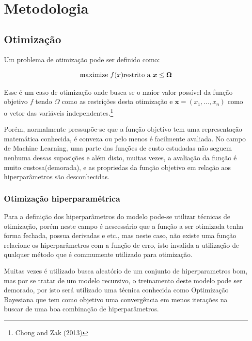 \documentclass[
	12pt,				%
	a4paper,		%
	oneside,    %
	chapter=TITLE,		   %
	section=TITLE,		   %
	subsection=TITLE,	   %
	subsubsection=TITLE, %
	english,			%
	french,				%
	spanish,			%
	brazil,				%
]{abntex2}
\begin{document}
\hypertarget{metodologia}{%
\chapter{Metodologia}\label{metodologia}}

\hypertarget{otimizauxe7uxe3o}{%
\section{Otimização}\label{otimizauxe7uxe3o}}

Um problema de otimização pode ser definido como:

\[
\mbox{maximize } f(x) \\
\\
\mbox{restrito a } \boldsymbol{x} \leq \boldsymbol{\Omega}
\]

Esse é um caso de otimização onde busca-se o maior valor possível da
função objetivo \(f\) tendo \(\Omega\) como as restrições desta
otimização e \(\boldsymbol{x} = (x_1,...,x_n)\) como o vetor das
variáveis independentes.\footnote{Chong and Zak (2013)}

Porém, normalmente pressupõe-se que a função objetivo tem uma
representação matemática conhecida, é convexa ou pelo menos é facilmente
avaliada. No campo de Machine Learning, uma parte das funções de custo
estudadas não seguem nenhuma dessas suposições e além disto, muitas
vezes, a avaliação da função é muito custosa(demorada), e as propriedas
da função objetivo em relação aos hiperparâmetros são desconhecidas.

\hypertarget{otimizauxe7uxe3o-hiperparamuxe9trica}{%
\subsection{Otimização
hiperparamétrica}\label{otimizauxe7uxe3o-hiperparamuxe9trica}}

Para a definição dos hiperparâmetros do modelo pode-se utilizar técnicas
de otimização, porém neste campo é nescessário que a função a ser
otimizada tenha forma fechada, possua derivadas e etc., mas neste caso,
não existe uma função relacione os hiperparâmetros com a função de erro,
isto invalida a utilização de qualquer método que é commumente utilizado
para otimização.

Muitas vezes é utilizado busca aleatório de um conjunto de
hiperparametros bom, mas por se tratar de um modelo recursivo, o
treinamento deste modelo pode ser demorado, por isto será utilizado uma
técnica conhecida como Optimização Bayesiana que tem como objetivo uma
convergência em menos iterações na buscar de uma boa combinação de
hiperparâmetros.
\end{document}
